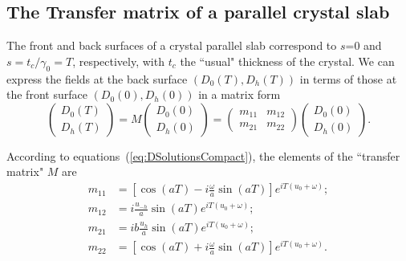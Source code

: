 \documentclass{iucr}
\begin{document}



\subsection{The Transfer matrix of a parallel crystal slab}
\label{sec:transferMatrix}

The front and back surfaces of a crystal parallel slab correspond to $s$=0 and $s=t_c/\gamma_0=T$, respectively, with $t_c$ the ``usual" thickness of the crystal.
We can express the fields at the back surface $(D_0(T),D_h(T))$ in terms of those at the front surface $(D_0(0),D_h(0))$ in a matrix form
\begin{equation}\label{eq:Mtransfer}
    \begin{pmatrix}
    D_0(T)\\
    D_h(T)
    \end{pmatrix}
    =
    M
        \begin{pmatrix}
    D_0(0) \\
    D_h(0)
    \end{pmatrix}
    =
    \begin{pmatrix}
    m_{11} & m_{12}\\
    m_{21} & m_{22}
    \end{pmatrix}
    \begin{pmatrix}
    D_0(0) \\
    D_h(0)
    \end{pmatrix}.
\end{equation}

According to equations~(\ref{eq:DSolutionsCompact}), the elements of the ``transfer matrix" $M$ are
\begin{subequations}\label{eq:MtransferElements}
\begin{align}
m_{11} &= \left[ \cos(aT)-i\frac{\omega}{a}\sin(aT) \right] e^{i T (u_0+\omega)};\\
m_{12} &= i \frac{u_{-h}}{a}\sin(aT) e^{i T (u_0+\omega)};\\
m_{21} &= i b \frac{u_h }{a} \sin(aT) e^{i T (u_0+\omega)};\\
m_{22} &= \left[ \cos(aT)+i \frac{\omega}{a}\sin(aT) \right] e^{i T (u_0+\omega)}.
\end{align}
\end{subequations}
\end{document}

